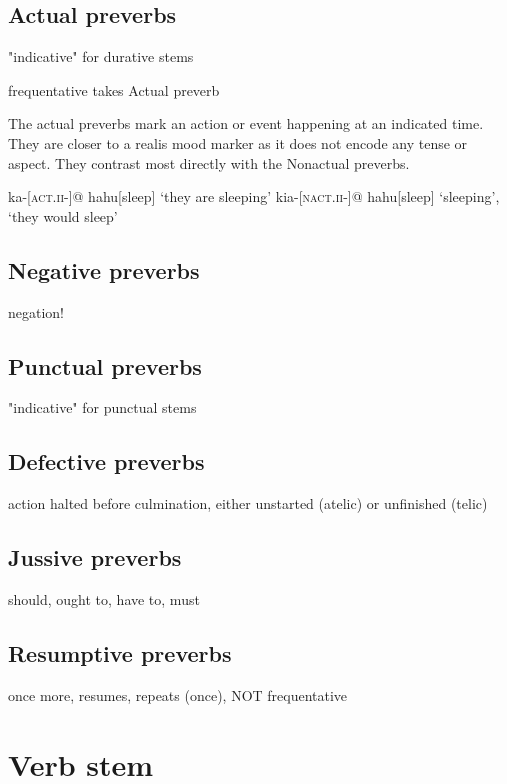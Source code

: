 \documentclass[smallroyalvopaper,9pt]{memoir}
\begin{document}
\subsection{Actual preverbs}

"indicative" for durative stems

frequentative takes Actual preverb

The actual preverbs mark an action or event happening at an indicated time. They are closer to a realis mood marker as it does not encode any tense or aspect. They contrast most directly with the Nonactual preverbs.

\pex
\a\begingl
ka-[\textsc{act.ii}-]@
hahu[sleep]
\glft `they are sleeping'
\endgl
\a\begingl
kia-[\textsc{nact.ii}-]@
hahu[sleep]
\glft `sleeping', `they would sleep'
\endgl
\xe

\subsection{Negative preverbs}

negation!

\subsection{Punctual preverbs}

"indicative" for punctual stems

\subsection{Defective preverbs}

action halted before culmination, either unstarted (atelic) or unfinished (telic)

\subsection{Jussive preverbs}

should, ought to, have to, must

\subsection{Resumptive preverbs}

once more, resumes, repeats (once), NOT frequentative

\section{Verb stem}
\end{document}

